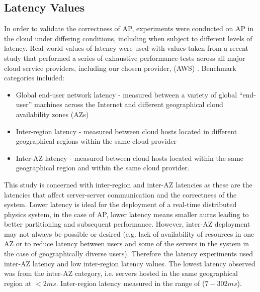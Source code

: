 

\subsection{Latency Values}
In order to validate the correctness of AP, experiments were conducted on AP in the cloud under differing conditions, including when subject to different levels of latency. Real world values of latency were used with values taken from a recent study that performed a series of exhaustive performance tests across all major cloud service providers, including our chosen provider, (AWS) \cite{ThousandEyesCloudPerf2019}. Benchmark categories included:
\begin{itemize}
	\item Global end-user network latency - measured between a variety of global ``end-user'' machines across the Internet and different geographical cloud availability zones (AZs)
	\item Inter-region latency - measured between cloud hosts located in different geographical regions within the same cloud provider
	\item Inter-AZ latency - measured between cloud hosts located within the same geographical region and within the same cloud provider.
\end{itemize}

This study is concerned with inter-region and inter-AZ latencies as these are the latencies that affect server-server communication and the correctness of the system. Lower latency is ideal for the deployment of a real-time distributed physics system, in the case of AP, lower latency means smaller auras leading to better partitioning and subsequent performance. However, inter-AZ deployment may not always be possible or desired (e.g. lack of availability of resources in one AZ or to reduce latency between users and some of the servers in the system in the case of geographically diverse users). Therefore the latency experiments used inter-AZ latency and low inter-region latency values. The lowest latency observed was from the inter-AZ category, i.e. servers hosted in the same geographical region at $<2ms$. Inter-region latency measured in the range of ($7-302ms$). 

